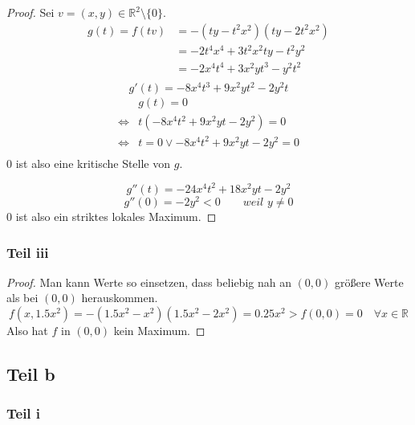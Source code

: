 \documentclass[10pt,a4paper]{article}
\begin{document}
\begin{proof}
Sei $v = (x, y) \in \mathbb{R}^{2} \setminus \{0\}$.
\begin{align*}
g(t) = f(tv) & = -(ty - t^{2}x^{2})(ty - 2t^{2}x^{2})\\
& = -2t^{4}x^{4} + 3t^{2}x^{2}ty - t^{2}y^{2}\\
& = -2x^{4}t^{4} + 3x^{2}yt^{3} - y^{2}t^{2}\\
\end{align*}
\begin{equation}
g'(t) = -8x^{4}t^{3} + 9x^{2}yt^{2} - 2y^{2}t
\end{equation}
\begin{align*}
& g(t) = 0\\
\Leftrightarrow & t(-8x^{4}t^{2} + 9x^{2}yt - 2y^{2}) = 0\\
\Leftrightarrow & t = 0 \lor -8x^{4}t^{2} + 9x^{2}yt - 2y^{2} = 0\\
\end{align*}
$0$ ist also eine kritische Stelle von $g$.

\begin{equation}
g''(t) = -24x^{4}t^{2} + 18x^{2}yt - 2y^{2}
\end{equation}
\begin{equation}
g''(0) = -2y^{2} < 0 \qquad \textit{weil $y \ne 0$}
\end{equation}
$0$ ist also ein striktes lokales Maximum.
\end{proof}

\subsubsection*{Teil iii}

\begin{proof}
Man kann Werte so einsetzen, dass beliebig nah an $(0, 0)$ größere Werte als bei $(0, 0)$ herauskommen.
\begin{equation}
f(x, 1.5x^{2}) = -(1.5x^{2} - x^{2})(1.5x^{2} - 2x^{2}) = 0.25x^{2} > f(0, 0) = 0 \quad \forall x \in \mathbb{R}
\end{equation}
Also hat $f$ in $(0, 0)$ kein Maximum.
\end{proof}

\subsection*{Teil b}

\subsubsection*{Teil i}
\end{document}
